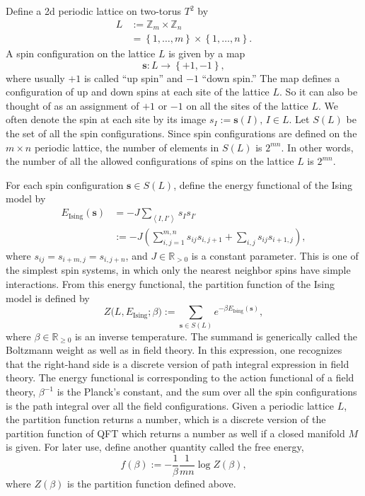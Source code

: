 Define a 2d periodic lattice on two-torus $T^{2}$ by
\begin{align}
L
  & :=  \mathbb{Z}_{m}\times\mathbb{Z}_{n}  \nonumber \\
  & =   \left\{ 1,\ldots,m\right\} \times\left\{ 1,\ldots,n\right\} .
\end{align}
A spin configuration on the lattice $L$ is given by a map
\begin{equation}
  \mathbf{s}  :  L  \longrightarrow  \left\{ +1,-1\right\} ,
\end{equation}
where usually $+1$ is called ``up spin'' and $-1$ ``down spin.'' The
map defines a configuration of up and down spins at each site of the lattice $L$. So it
can also be thought of as an assignment of $+1$ or $-1$ on all the
sites of the lattice $L$. We often denote the spin at each site by
its image $s_{I} := \mathbf{s}(I),\,I\in L$. Let $S(L)$
be the set of all the spin configurations. Since spin configurations
are defined on the $m\times n$ periodic lattice, the number of elements
in $S(L)$ is $2^{mn}$. In other words, the number of
all the allowed configurations of spins on the lattice $L$ is $2^{mn}$.

For each spin configuration $\mathbf{s}\in S(L)$, define
the energy functional of the Ising model by
\begin{align}
  E_{\mathrm{Ising}}(\mathbf{s})
  & =   -J  \sum_{\left\langle I,I'\right\rangle } s_{I}s_{I'}  \nonumber \\
  & :=  -J  \left( \sum_{i,j=1}^{m,n}s_{ij}s_{i,j+1}+\sum_{i,j}s_{ij}s_{i+1,j} \right),
\end{align}
where $s_{ij}=s_{i+m,j}=s_{i,j+n}$, and $J\in\mathbb{R}_{>0}$
is a constant parameter. This is one of the simplest spin systems,
in which only the nearest neighbor spins have simple interactions. From this
energy functional, the partition function of the Ising model is defined
by
\begin{equation}
  Z\big(L,E_{\mathrm{Ising}};\beta\big)
    :=  \sum_{\mathbf{s}\in S(L)}  e^{-\beta E_{\mathrm{Ising}}(\mathbf{s})},
\end{equation}
where $\beta\in\mathbb{R}_{\geq0}$ is an inverse temperature. The
summand is generically called the Boltzmann weight as well as in field
theory. In this expression, one recognizes that the right-hand side
is a discrete version of path integral expression in field theory.
The energy functional is corresponding to the action functional of
a field theory, $\beta^{-1}$ is the Planck's constant, and the sum
over all the spin configurations is the path integral over all the
field configurations. Given a periodic lattice $L$, the partition
function returns a number, which is a discrete version of the partition
function of QFT which returns a number as well if a closed manifold
$M$ is given. For later use, define another quantity called the free
energy,
\begin{equation}
  f(\beta)  :=  -\frac{1}{\beta}\frac{1}{mn}\log Z(\beta),
\end{equation}
where $Z(\beta)$ is the partition function defined above.

